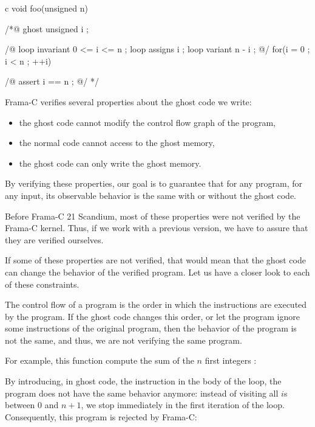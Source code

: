 \begin{CodeBlock}{c}
void foo(unsigned n){
 /*@ ghost
   unsigned i ;

   /@
     loop invariant 0 <= i <= n ;
     loop assigns i ;
     loop variant n - i ;
   @/
   for(i = 0 ; i < n ; ++i){

   }
   /@ assert i == n ; @/
 */
}
\end{CodeBlock}




Frama-C verifies several properties about the ghost code we write:


\begin{itemize}
\item the ghost code cannot modify the control flow graph of the program,
\item the normal code cannot access to the ghost memory,
\item the ghost code can only write the ghost memory.
\end{itemize}


By verifying these properties, our goal is to guarantee that for any
program, for any input, its observable behavior is the same with or
without the ghost code.


\begin{Warning}
  Before Frama-C 21 Scandium, most of these properties were not
  verified by the Frama-C kernel. Thus, if we work with a previous
  version, we have to assure that they are verified ourselves.
\end{Warning}


If some of these properties are not verified, that would mean that
the ghost code can change the behavior of the verified program.
Let us have a closer look to each of these constraints.




The control flow of a program is the order in which the instructions
are executed by the program. If the ghost code changes this order, or
let the program ignore some instructions of the original program, then
the behavior of the program is not the same, and thus, we are not
verifying the same program.


For example, this function compute the sum of the $n$ first integers :




By introducing, in ghost code, the instruction  in
the body of the loop, the program does not have the same behavior
anymore: instead of visiting all $i$s between $0$ and $n+1$, we stop
immediately in the first iteration of the loop. Consequently, this
program is rejected by Frama-C:


